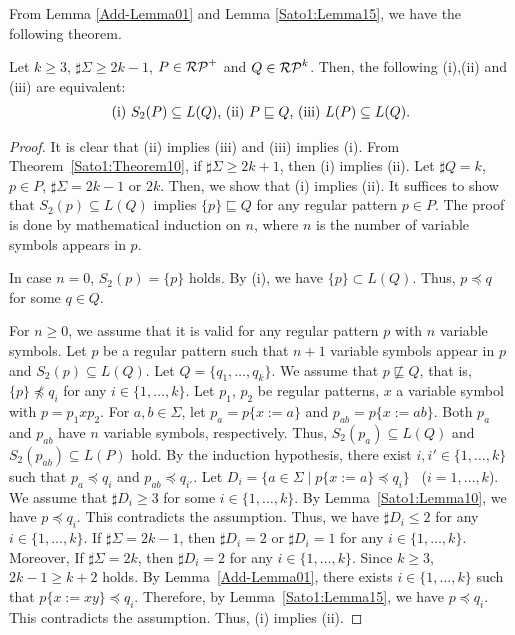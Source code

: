 From Lemma \ref{Add-Lemma01} 
and Lemma \ref{Sato1:Lemma15}, 
we have the following theorem.


\begin{thm}\label{Theorem17}
    Let $k \geq 3$, $\sharp\Sigma \geq 2k-1$, $P \in \mathcal{RP}^{+}$ and
    $Q \in \mathcal{RP}^{k}$.
    Then, the following (i),(ii) and (iii) are equivalent:
    \[
        \begin{tabular}{ll}
            $(\mathrm{i})$ $S_{2}(P) \subseteq L(Q)$,
            $(\mathrm{ii})$ $P \sqsubseteq Q$,
            $(\mathrm{iii})$ $L(P) \subseteq L(Q)$.
        \end{tabular}
    \]
\end{thm}


\begin{proof}
    It is clear that (ii) implies (iii) and (iii) implies (i).
    From Theorem~\ref{Sato1:Theorem10}, 
    if $\sharp\Sigma \geq 2k+1$, then
    (i) implies (ii).
    Let $\sharp Q = k$, $p \in P$, $\sharp\Sigma = 2k-1$ or $2k$.
    Then, we show that (i) implies (ii).
    It suffices to show that $S_{2}(p) \subseteq L(Q)$ implies {\color{red}$\{p\} \sqsubseteq Q$}
    for any regular pattern {\color{red}$p \in P$}.
    The proof is done by mathematical induction on $n$, where $n$ is the number of variable symbols appears in $p$.

    In case $n=0$, $S_{2}(p) = \{p\}$ holds.
    By (i), we have {\color{red}$\{p\} \subset L(Q)$}. Thus, $p \preceq q$ for some $q \in Q$.

    For $n \geq 0$,
    we assume that it is valid for any regular pattern $p$
    with $n$ variable symbols.
    Let $p$ be a regular pattern such that $n+1$ variable symbols appear in $p$
    and $S_{2}(p) \subseteq L(Q)$.
    {\color{red} Let $Q = \{q_{1},\ldots,q_{k}\}$.}
    We assume that $p \not\sqsubseteq Q$, that is, {\color{red}$\{p\} \not\preceq q_{i}$}
    for any $i \in \{1,\ldots,k\}$.
    {\color{red} Let $p_{1}$, $p_{2}$ be regular patterns, $x$ a variable symbol with $p = p_{1}xp_{2}$.}
    For $a, b \in \Sigma$,
    let $p_{a}=p\{x:=a\}$ and $p_{ab}=p\{x:=ab\}$.
    Both $p_{a}$ and $p_{ab}$ have $n$ variable symbols, respectively.
    Thus, $S_{2}(p_{a}) \subseteq L(Q)$ and $S_{2}(p_{ab}) \subseteq L(P)$ hold.
    By the induction hypothesis,
    there exist $i, i' \in \{1,\ldots,k\}$ such that
    $p_{a} \preceq q_{i}$ and $p_{ab} \preceq q_{i'}$.
    Let $D_{i} = \{a \in \Sigma \mid p\{x:=a\} \preceq q_{i}\}$ \ ($i=1,\ldots,k$).
    We assume that $\sharp D_{i} \geq 3$ for some $i \in \{1,\ldots, k\}$.
    By Lemma~\ref{Sato1:Lemma10}, 
    we have $p \preceq q_{i}$.
    This contradicts the assumption.
    Thus, we have $\sharp D_{i} \leq 2$ for any $i \in \{1,\ldots,k\}$.
    If $\sharp\Sigma = 2k-1$, then
    $\sharp D_{i}=2$ or $\sharp D_{i}=1$ for any $i \in \{1,\ldots,k\}$.
    Moreover,
    If $\sharp\Sigma = 2k$, then
    $\sharp D_{i}=2$ for any $i \in \{1,\ldots,k\}$.
    Since $k \geq 3$, {\color{red} $2k-1 \geq k+2$} holds.
    By Lemma~\ref{Add-Lemma01},
    there exists $i \in \{1,\ldots,k\}$ such that $p\{x:=xy\} \preceq q_{i}$.
    Therefore, by Lemma~\ref{Sato1:Lemma15}, 
    we have $p \preceq q_{i}$.
    This contradicts the assumption.
    Thus, (i) implies (ii).
\end{proof}

